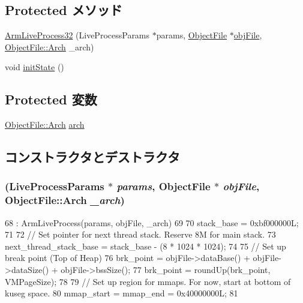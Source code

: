 \subsection*{Protected メソッド}
\begin{DoxyCompactItemize}
\item 
\hyperlink{classArmLiveProcess32_a9135eba958dcc24c1dfefbf8642c4df3}{ArmLiveProcess32} (LiveProcessParams $\ast$params, \hyperlink{classObjectFile}{ObjectFile} $\ast$\hyperlink{classLiveProcess_ab6cfcfa7903c66267b3e0351c3caa809}{objFile}, \hyperlink{classObjectFile_a0ac03ab06a859320a9072002bdf3aa0f}{ObjectFile::Arch} \_\-arch)
\item 
void \hyperlink{classArmLiveProcess32_a3c34ea9b29f410748d4435a667484924}{initState} ()
\end{DoxyCompactItemize}
\subsection*{Protected 変数}
\begin{DoxyCompactItemize}
\item 
\hyperlink{classObjectFile_a0ac03ab06a859320a9072002bdf3aa0f}{ObjectFile::Arch} \hyperlink{classArmLiveProcess32_abf93aa1dd69df35e2a50f63d5a5d4c40}{arch}
\end{DoxyCompactItemize}


\subsection{コンストラクタとデストラクタ}
\hypertarget{classArmLiveProcess32_a9135eba958dcc24c1dfefbf8642c4df3}{
\subsubsection[{ArmLiveProcess32}]{ (LiveProcessParams $\ast$ {\em params}, \/  {\bf ObjectFile} $\ast$ {\em objFile}, \/  {\bf ObjectFile::Arch} {\em \_\-arch})}}
\label{classArmLiveProcess32_a9135eba958dcc24c1dfefbf8642c4df3}



\begin{DoxyCode}
68     : ArmLiveProcess(params, objFile, _arch)
69 {
70     stack_base = 0xbf000000L;
71 
72     // Set pointer for next thread stack.  Reserve 8M for main stack.
73     next_thread_stack_base = stack_base - (8 * 1024 * 1024);
74 
75     // Set up break point (Top of Heap)
76     brk_point = objFile->dataBase() + objFile->dataSize() + objFile->bssSize();
77     brk_point = roundUp(brk_point, VMPageSize);
78 
79     // Set up region for mmaps. For now, start at bottom of kuseg space.
80     mmap_start = mmap_end = 0x40000000L;
81 }
\end{DoxyCode}


